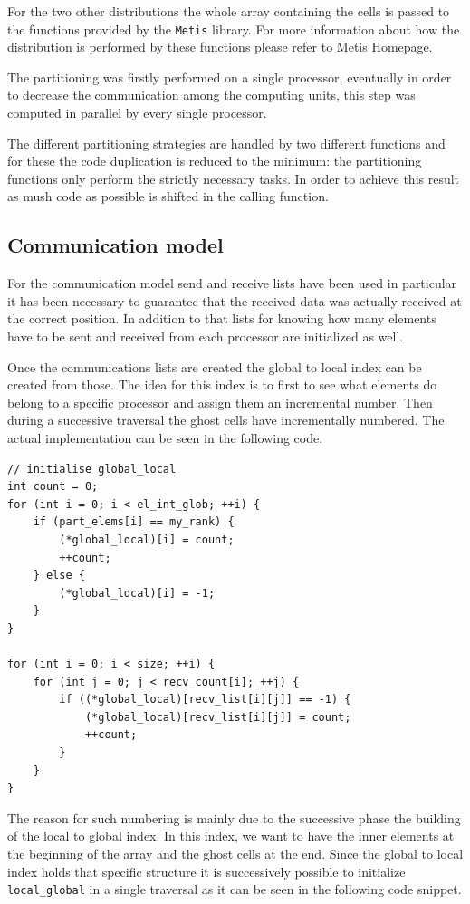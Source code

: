 \documentclass[12pt, a4paper]{article}
\begin{document}
  For the two other distributions the whole array containing the cells is passed
  to the functions provided by the \verb=Metis= library. For more information 
  about how the distribution is performed by these functions please refer to
  \href{http://glaros.dtc.umn.edu/gkhome/metis/metis/overview}{Metis Homepage}.

  The partitioning was firstly performed on a single processor, eventually in
  order to decrease the communication among the computing units, this step was
  computed in parallel by every single processor.

  The different partitioning strategies are handled by two different functions
  and for these the code duplication is reduced to the minimum: the partitioning
  functions only perform the strictly necessary tasks. In order to achieve this
  result as mush code as possible is shifted in the calling function.

  \subsection*{Communication model}
  For the communication model send and receive lists have been used in
  particular it has been necessary to guarantee that the received data was
  actually received at the correct position. In addition to that lists for
  knowing how many elements have to be sent and received from each processor are
  initialized as well.

  Once the communications lists are created the global to local index can be
  created from those. The idea for this index is to first to see what elements
  do belong to a specific processor and assign them an incremental number. Then
  during a successive traversal the ghost cells have incrementally numbered.
  The actual implementation can be seen in the following code.

  \begin{verbatim}
// initialise global_local  
int count = 0;
for (int i = 0; i < el_int_glob; ++i) {
    if (part_elems[i] == my_rank) {
        (*global_local)[i] = count;
        ++count;
    } else {
        (*global_local)[i] = -1;
    }
}

for (int i = 0; i < size; ++i) {
    for (int j = 0; j < recv_count[i]; ++j) {
        if ((*global_local)[recv_list[i][j]] == -1) {
            (*global_local)[recv_list[i][j]] = count;
            ++count;
        }
    }
}
  \end{verbatim}

  The reason for such numbering is mainly due to the successive phase the
  building of the local to global index. In this index, we want to have the
  inner elements at the beginning of the array and the ghost cells at the end.
  Since the global to local index holds that specific structure it is
  successively possible to initialize \verb=local_global=  in a single 
  traversal as it can be seen in the following code snippet.
\end{document}
